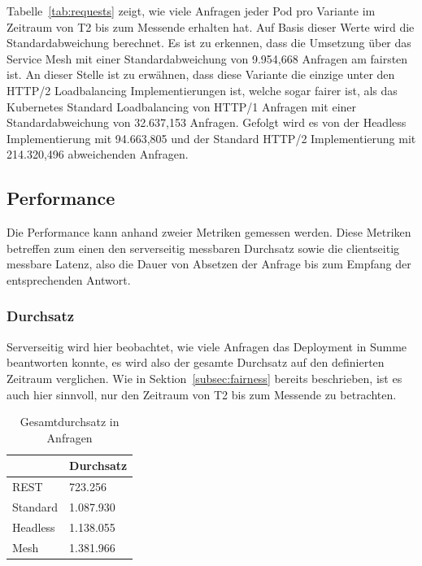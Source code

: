 Tabelle~\ref{tab:requests} zeigt, wie viele Anfragen jeder Pod pro Variante im Zeitraum von T2 bis zum Messende erhalten hat.
Auf Basis dieser Werte wird die Standardabweichung berechnet.
Es ist zu erkennen, dass die Umsetzung über das Service Mesh mit einer Standardabweichung von 9.954,668 Anfragen am fairsten ist.
An dieser Stelle ist zu erwähnen, dass diese Variante die einzige unter den HTTP/2 Loadbalancing Implementierungen ist, welche sogar fairer ist, als das Kubernetes Standard Loadbalancing von HTTP/1 Anfragen mit einer Standardabweichung von 32.637,153 Anfragen.
Gefolgt wird es von der Headless Implementierung mit 94.663,805 und der Standard HTTP/2 Implementierung mit 214.320,496 abweichenden Anfragen.

\subsection{Performance}\label{subsec:performance}

Die Performance kann anhand zweier Metriken gemessen werden.
Diese Metriken betreffen zum einen den serverseitig messbaren Durchsatz sowie die clientseitig messbare Latenz, also die Dauer von Absetzen der Anfrage bis zum Empfang der entsprechenden Antwort.

\subsubsection{Durchsatz}

Serverseitig wird hier beobachtet, wie viele Anfragen das Deployment in Summe beantworten konnte, es wird also der gesamte Durchsatz auf den definierten Zeitraum verglichen.
Wie in Sektion~\ref{subsec:fairness} bereits beschrieben, ist es auch hier sinnvoll, nur den Zeitraum von T2 bis zum Messende zu betrachten.

\begin{table}[H]
    \centering
    \begin{tabular}{|l|l|}
        \hline
        & Durchsatz \\ \hline
        REST     & 723.256    \\ \hline
        Standard & 1.087.930   \\ \hline
        Headless & 1.138.055   \\ \hline
        Mesh     & 1.381.966   \\ \hline
    \end{tabular}
    \caption{Gesamtdurchsatz in Anfragen}
    \label{tab:durchsatz}
\end{table}

